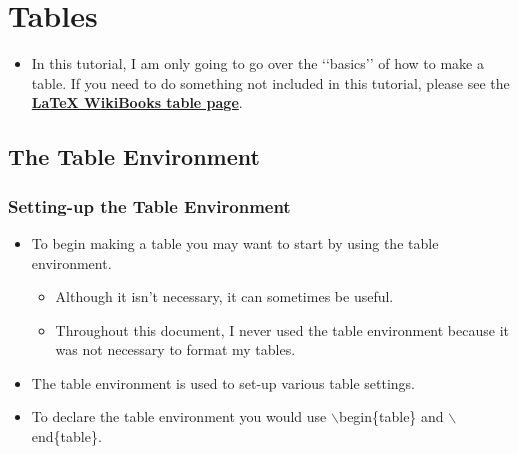 \documentclass{article}
\begin{document}
	\section{Tables}
		\begin{itemize}
			\item In this tutorial, I am only going to go over the \lq\lq{}basics\rq\rq{} of how to make a table. If you need to do something not included in this tutorial, please see the \href{https://en.wikibooks.org/wiki/LaTeX/Tables}{\textbf{\LaTeX{} WikiBooks table page}}.
		\end{itemize}
		\subsection{The Table Environment}
			\subsubsection{Setting-up the Table Environment}
				\begin{itemize}
					\item To begin making a table you may want to start by using the table environment. 
					\begin{itemize}
						\item Although it isn\rq{}t necessary, it can sometimes be useful.
						\item Throughout this document, I never used the table environment because it was not necessary to format my tables.
					\end{itemize}
					\item The table environment is used to set-up various table settings.
					\item To declare the table environment you would use $\backslash$begin\{table\} and $\backslash$end\{table\}.	
				\end{itemize}
				
\end{document}
